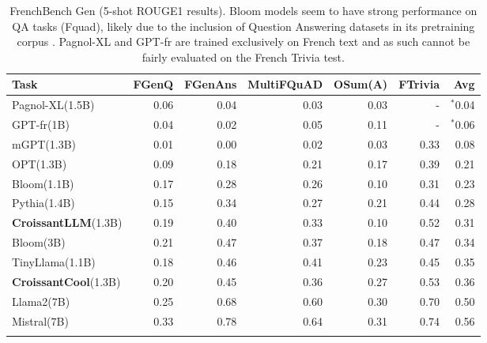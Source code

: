\begin{table}
    \centering
    \begin{tabular}{lrrrrrr}
        \toprule
        Task & FGenQ & FGenAns & MultiFQuAD & OSum(A) & FTrivia & Avg \\
        \midrule
        Pagnol-XL(1.5B) & 0.06 & 0.04 & 0.03 & 0.03 & - & $^*$0.04  \\
        GPT-fr(1B) & 0.04 & 0.02 & 0.05 & 0.11 & - & $^*$0.06\\
        mGPT(1.3B) & 0.01 & 0.00 & 0.02 & 0.03 & 0.33 &  0.08 \\
        OPT(1.3B) & 0.09 & 0.18 & 0.21 & 0.17 & 0.39 & 0.21 \\
        Bloom(1.1B) & 0.17 & 0.28 & 0.26 & 0.10 & 0.31 & 0.23 \\
        Pythia(1.4B) & 0.15 & 0.34 & 0.27 & 0.21 & 0.44 & 0.28 \\
        \textbf{CroissantLLM}(1.3B) & 0.19 & 0.40 & 0.33 & 0.10 & 0.52 & 0.31 \\
        Bloom(3B) & 0.21 & 0.47 & 0.37 & 0.18 & 0.47 & 0.34 \\
        TinyLlama(1.1B) & 0.18 & 0.46 & 0.41 & 0.23 & 0.45 & 0.35 \\
        \textbf{CroissantCool}(1.3B)& 0.20 & 0.45 & 0.36 & 0.27 & 0.53 & 0.36 \\
        \midrule
        Llama2(7B) & 0.25 & 0.68 & 0.60 & 0.30 & 0.70 & 0.50 \\
        Mistral(7B) & 0.33 & 0.78 & 0.64 & 0.31 & 0.74 & 0.56 \\
        \bottomrule
        \vspace{0.2mm}
        \end{tabular}
        
    \caption[FrenchBench Gen results]{FrenchBench Gen (5-shot ROUGE1 results). Bloom models seem to have strong performance on QA tasks (Fquad), likely due to the inclusion of Question Answering datasets in its pretraining corpus \cite{laurençon2023bigscience}. Pagnol-XL and GPT-fr are trained exclusively on French text and as such cannot be fairly evaluated on the French Trivia test.}
    \label{tab:fr_resgen}
\end{table}


